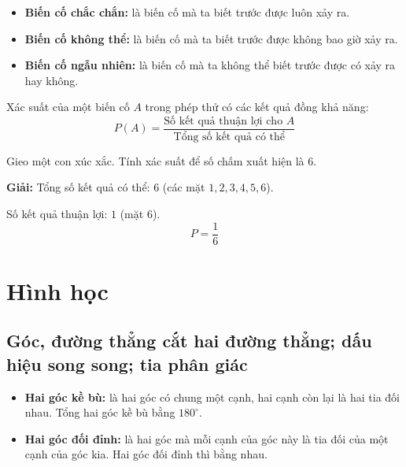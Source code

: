 \documentclass[12pt,a4paper]{article}
\begin{document}
\begin{dinhnghia}
\begin{itemize}
  \item \textbf{Biến cố chắc chắn:} là biến cố mà ta biết trước được luôn xảy ra.
  \item \textbf{Biến cố không thể:} là biến cố mà ta biết trước được không bao giờ xảy ra.
  \item \textbf{Biến cố ngẫu nhiên:} là biến cố mà ta không thể biết trước được có xảy ra hay không.
\end{itemize}
\end{dinhnghia}

\begin{congthuc}[title={Tính xác suất}]
Xác suất của một biến cố $A$ trong phép thử có các kết quả đồng khả năng:
\[
  P(A) = \frac{\text{Số kết quả thuận lợi cho } A}{\text{Tổng số kết quả có thể}}
\]
\end{congthuc}

\begin{vidu}
Gieo một con xúc xắc. Tính xác suất để số chấm xuất hiện là $6$.

\textbf{Giải:} Tổng số kết quả có thể: $6$ (các mặt $1, 2, 3, 4, 5, 6$).

Số kết quả thuận lợi: $1$ (mặt $6$).
\[
  P = \frac{1}{6}
\]
\end{vidu}

\section{Hình học}

\subsection{Góc, đường thẳng cắt hai đường thẳng; dấu hiệu song song; tia phân giác}

\begin{dinhnghia}
\begin{itemize}
  \item \textbf{Hai góc kề bù:} là hai góc có chung một cạnh, hai cạnh còn lại là hai tia đối nhau. Tổng hai góc kề bù bằng $180^\circ$.
  \item \textbf{Hai góc đối đỉnh:} là hai góc mà mỗi cạnh của góc này là tia đối của một cạnh của góc kia. Hai góc đối đỉnh thì bằng nhau.
\end{itemize}
\end{dinhnghia}
\end{document}
